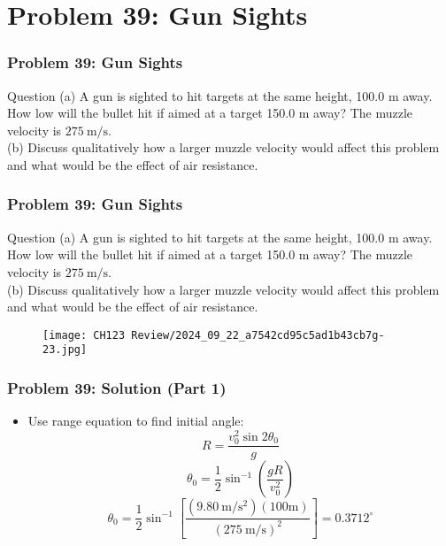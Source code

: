 \documentclass{beamer}
\begin{document}
\section{Problem 39: Gun Sights}

\begin{frame}
\frametitle{Problem 39: Gun Sights}
\begin{block}{Question}
(a) A gun is sighted to hit targets at the same height, 100.0 m away. How low will the bullet hit if aimed at a target 150.0 m away? The muzzle velocity is $275 \mathrm{~m} / \mathrm{s}$.\\

(b) Discuss qualitatively how a larger muzzle velocity would affect this problem and what would be the effect of air resistance.
\end{block}

\end{frame}

\begin{frame}
\frametitle{Problem 39: Gun Sights}
\begin{block}{Question}
(a) A gun is sighted to hit targets at the same height, 100.0 m away. How low will the bullet hit if aimed at a target 150.0 m away? The muzzle velocity is $275 \mathrm{~m} / \mathrm{s}$.\\

(b) Discuss qualitatively how a larger muzzle velocity would affect this problem and what would be the effect of air resistance.
\end{block}
\begin{figure}[H]
    \centering
    \texttt{[image: CH123 Review/2024\_09\_22\_a7542cd95c5ad1b43cb7g-23.jpg]}
\end{figure}

\end{frame}

\begin{frame}
\frametitle{Problem 39: Solution (Part 1)}
\begin{itemize}
    \item Use range equation to find initial angle:
    $$R=\frac{v_{0}^{2} \sin 2 \theta_{0}}{g}$$
    $$\theta_{0}=\frac{1}{2} \sin ^{-1}\left(\frac{g R}{v_{0}^{2}}\right)$$
    $$\theta_{0}=\frac{1}{2} \sin ^{-1}\left[\frac{\left(9.80 \mathrm{~m} / \mathrm{s}^{2}\right)(100 \mathrm{m})}{(275 \mathrm{~m} / \mathrm{s})^{2}}\right]=0.3712^{\circ}$$
\end{itemize}
\end{frame}
\end{document}

